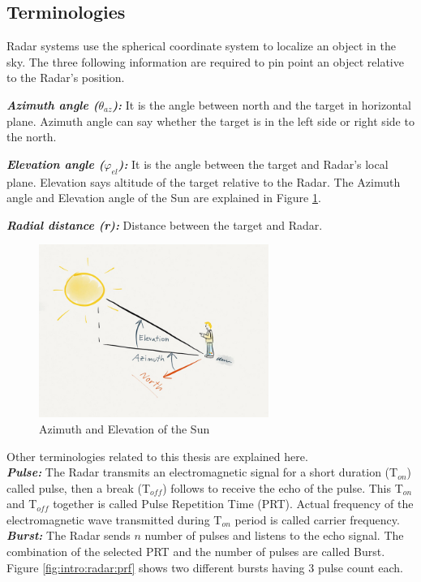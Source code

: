 \subsection{Terminologies}
Radar systems use the spherical coordinate system to localize an object in the sky. The three following information are required to pin point an object relative to the Radar's position.

\textsl{\textbf{Azimuth angle ($\theta _{az}$):}} It is the angle between north and the target in horizontal plane. Azimuth angle can say whether the target is in the left side or right side to the north.

\textsl{\textbf{Elevation angle ($\varphi _{el}$):}} It is the angle between the target and Radar's local plane. Elevation says altitude of the target relative to the Radar. The Azimuth angle and Elevation angle of the Sun are explained in Figure \ref{fig:intro:radar:aziele}.

\textsl{\textbf{Radial distance (r):}} Distance between the target and Radar.\\

\begin{figure}[h!]
	\centering
	\includegraphics[width=75mm]{figures/azimuth_elevation}
	\caption{Azimuth and Elevation of the Sun \cite{aziEle}}
	\label{fig:intro:radar:aziele}
\end{figure}
\noindent
Other terminologies related to this thesis are explained here. \\[0.4cm]
\textsl{\textbf{Pulse:}} The Radar transmits an electromagnetic signal for a short duration (T$_{on}$) called pulse, then a break (T$_{off}$) follows to receive the echo of the pulse. This T$_{on}$ and T$_{off}$ together is called Pulse Repetition Time (PRT). Actual frequency of the electromagnetic wave transmitted during T$_{on}$ period is called carrier frequency.\\[0.2cm]
\noindent
\textsl{\textbf{Burst:}} The Radar sends $n$ number of pulses and listens to the echo signal. The combination of the selected PRT and the number of pulses are called Burst. Figure \ref{fig:intro:radar:prf} shows two different bursts having 3 pulse count each.

